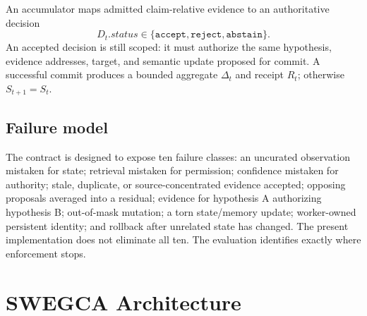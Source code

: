 \documentclass[10pt]{article}
\begin{document}
An accumulator maps admitted claim-relative evidence to an authoritative decision
\begin{equation}
  D_t.status\in\{\texttt{accept},\texttt{reject},\texttt{abstain}\}.
\end{equation}
An accepted decision is still scoped: it must authorize the same hypothesis, evidence addresses, target, and semantic update proposed for commit. A successful commit produces a bounded aggregate $\Delta_t$ and receipt $R_t$; otherwise $S_{t+1}=S_t$.

\subsection{Failure model}

The contract is designed to expose ten failure classes: an uncurated observation mistaken for state; retrieval mistaken for permission; confidence mistaken for authority; stale, duplicate, or source-concentrated evidence accepted; opposing proposals averaged into a residual; evidence for hypothesis A authorizing hypothesis B; out-of-mask mutation; a torn state/memory update; worker-owned persistent identity; and rollback after unrelated state has changed. The present implementation does not eliminate all ten. The evaluation identifies exactly where enforcement stops.

\section{SWEGCA Architecture}
\end{document}

